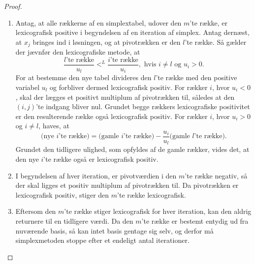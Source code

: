 \begin{proof}
\begin{enumerate}[label=(\alph*)]
\item Antag, at alle rækkerne af en simplextabel, udover den $m$'te række, er lexicografisk positive i begyndelsen af en iteration af simplex. 
Antag dernæst, at $x_j$ bringes ind i løsningen, og at pivotrækken er den $l$'te række.
Så gælder der jævnfør den lexicografiske metode, at
$$\dfrac{l\text{'te række}}{u_l}<^L \dfrac{i\text{'te række}}{u_i}, \text{  hvis } i\neq l \text{ og }u_i>0.$$
For at bestemme den nye tabel divideres den $l$'te række med den positive variabel $u_l$ og forbliver dermed lexicografisk positiv.
For rækker $i$, hvor $u_i<0$, skal der lægges et positivt multiplum af pivotrækken til, således at den $(i,j)$'te indgang bliver nul. 
Grundet begge rækkers lexicografiske positivitet er den resulterende række også lexicografisk positiv. 
For rækker $i$, hvor $u_i>0$ og $i\neq l$, haves, at
$$\text{(nye }i\text{'te række)}=\text{(gamle }i\text{'te række)}-\dfrac{u_i}{u_l}\text{(gamle }l\text{'te række)}.$$
Grundet den tidligere ulighed, som opfyldes af de gamle rækker, vides det, at den nye $i$'te række også er lexicografisk positiv.
% 
\item I begyndelsen af hver iteration, er pivotværdien i den $m$'te række negativ, så der skal ligges et positiv multiplum af pivotrækken til. 
Da pivotrækken er lexicografisk positiv, stiger den $m$'te række lexicografisk.
% 
\item Eftersom den $m$'te række stiger lexicografisk for hver iteration, kan den aldrig returnere til en tidligere værdi.
Da den $m$'te række er bestemt entydig ud fra nuværende basis, så kan intet basis gentage sig selv, og derfor må simplexmetoden stoppe efter et endeligt antal iterationer.
\end{enumerate}
\end{proof}
%
%
%
%
%